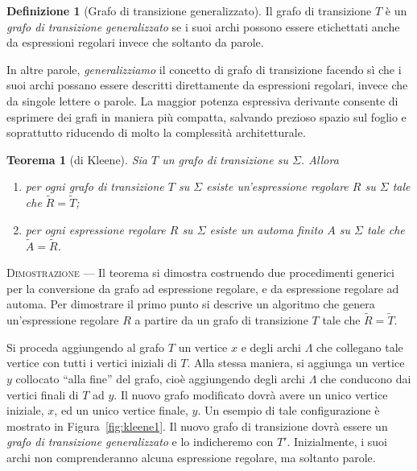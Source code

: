 \documentclass[10pt]{\classname}
\theoremstyle{newlinethm}
\newtheorem{thm}{Teorema}[section]
\theoremstyle{theorem}
\theoremstyle{definition}
\newtheorem{definizione}{Definizione}[section]
\theoremstyle{definition}
\theoremstyle{definition}
\theoremstyle{definition}
\begin{document}
\begin{definizione}[Grafo di transizione generalizzato]
    Il grafo di transizione $T$ è un \emph{grafo di transizione generalizzato} se i suoi archi possono essere
    etichettati anche da espressioni regolari invece che soltanto da parole.
\end{definizione}

In altre parole, \emph{generalizziamo} il concetto di grafo di transizione facendo sì che i suoi archi possano essere descritti direttamente da espressioni regolari, invece che da singole lettere o parole. La maggior potenza espressiva derivante consente di esprimere dei grafi in maniera più compatta, salvando prezioso spazio sul foglio e soprattutto riducendo di molto la complessità architetturale.

\begin{thm}[di Kleene]
    Sia $T$ un \emph{grafo di transizione su $\Sigma$}. Allora
\begin{enumerate}
    \item per ogni grafo di transizione $T$ su $\Sigma$ esiste un'espressione regolare $R$ su $\Sigma$ tale che $\tilde R = \tilde T$; 
    \item per ogni espressione regolare $R$ su $\Sigma$ esiste un automa finito $A$ su $\Sigma$ tale che $\tilde A = \tilde R$.
\end{enumerate}
\end{thm}

\textsc{Dimostrazione } --- Il teorema si dimostra costruendo due procedimenti generici per la conversione da grafo ad espressione regolare, e da espressione regolare ad automa. Per dimostrare il primo punto si descrive un algoritmo che genera un'espressione regolare $R$ a partire da un grafo di transizione $T$ tale che $\tilde R = \tilde T$. 

Si proceda aggiungendo al grafo $T$ un vertice $x$ e degli archi $\Lambda$ che
collegano tale vertice con tutti i vertici iniziali di $T$. Alla stessa
maniera, si aggiunga un vertice $y$ collocato ``alla fine'' del grafo, cioè
aggiungendo degli archi $\Lambda$ che conducono dai vertici finali di $T$ ad
$y$. Il nuovo grafo modificato dovrà avere un unico vertice iniziale, $x$, ed
un unico vertice finale, $y$. Un esempio di tale configurazione è mostrato in
Figura~\ref{fig:kleene1}. Il nuovo grafo di transizione dovrà essere un
\emph{grafo di transizione generalizzato} e lo indicheremo con $T'$.
Inizialmente, i suoi archi non comprenderanno alcuna espressione regolare, ma
soltanto parole.
\end{document}
